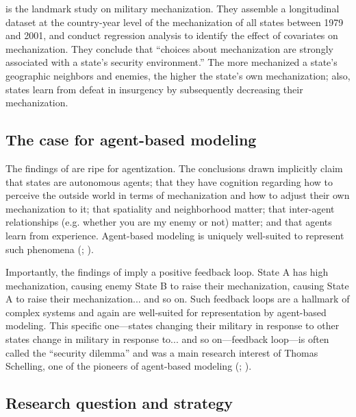 \documentclass{article}
\begin{document}
\cite{sechser2010army} is the landmark study on military mechanization. They
assemble a longitudinal dataset at the country-year level of the mechanization
of all states between 1979 and 2001, and conduct regression analysis to identify
the effect of covariates on mechanization. They conclude that ``choices about
mechanization are strongly associated with a state's security environment.''
The more mechanized a state's geographic neighbors and enemies, the higher the state's 
own mechanization; also, states
learn from defeat in insurgency by subsequently decreasing their mechanization.

\subsection{The case for agent-based modeling}

The findings of \cite{sechser2010army} are ripe for agentization. The
conclusions drawn implicitly claim
that states are autonomous agents; that they have
cognition regarding how to perceive the outside world in terms of mechanization
and how to adjust their own mechanization to it; that spatiality and
neighborhood matter; that inter-agent relationships (e.g. whether you are my
enemy or not) matter; and that
agents learn from experience. Agent-based modeling is uniquely well-suited to
represent such phenomena (\cite{gilbert2005simulation};
\cite{miller2009complex}).

Importantly, the findings of \cite{sechser2010army} imply a positive feedback
loop. State A has high
mechanization, causing enemy State B to raise their mechanization, causing State
A to raise their mechanization... and so on. Such feedback loops are a hallmark
of complex systems and again are well-suited for representation by agent-based
modeling. This specific one---states changing their military in response to
other states change in military in response to... and so on---feedback loop---is often called
the ``security dilemma'' and was a main research interest of Thomas Schelling, one of the pioneers
of agent-based modeling (\cite{schelling1960strategy};
\cite{schelling2006micromotives}).

\subsection{Research question and strategy}
\end{document}
